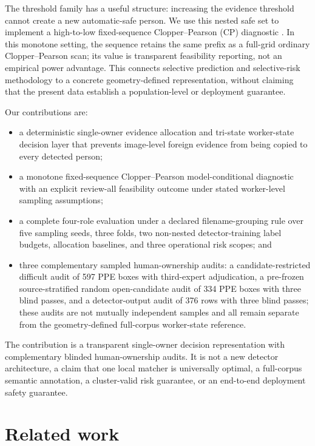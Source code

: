 \documentclass[iicol,pdflatex,sn-mathphys-num]{sn-jnl}
\begin{document}
The threshold family has a useful structure: increasing the evidence threshold cannot create a new automatic-safe person. We use this nested safe set to implement a high-to-low fixed-sequence Clopper--Pearson (CP) diagnostic \cite{clopper1934confidence}. In this monotone setting, the sequence retains the same prefix as a full-grid ordinary Clopper--Pearson scan; its value is transparent feasibility reporting, not an empirical power advantage. This connects selective prediction \cite{geifman2017selective} and selective-risk methodology \cite{angelopoulos2021learntest,angelopoulos2022conformal} to a concrete geometry-defined representation, without claiming that the present data establish a population-level or deployment guarantee.

Our contributions are:

\begin{itemize}
\item a deterministic single-owner evidence allocation and tri-state worker-state decision layer that prevents image-level foreign evidence from being copied to every detected person;
\item a monotone fixed-sequence Clopper--Pearson model-conditional diagnostic with an explicit review-all feasibility outcome under stated worker-level sampling assumptions;
\item a complete four-role evaluation under a declared filename-grouping rule over five sampling seeds, three folds, two non-nested detector-training label budgets, allocation baselines, and three operational risk scopes; and
\item three complementary sampled human-ownership audits: a candidate-restricted difficult audit of 597 PPE boxes with third-expert adjudication, a pre-frozen source-stratified random open-candidate audit of 334 PPE boxes with three blind passes, and a detector-output audit of 376 rows with three blind passes; these audits are not mutually independent samples and all remain separate from the geometry-defined full-corpus worker-state reference.
\end{itemize}

The contribution is a transparent single-owner decision representation with complementary blinded human-ownership audits. It is not a new detector architecture, a claim that one local matcher is universally optimal, a full-corpus semantic annotation, a cluster-valid risk guarantee, or an end-to-end deployment safety guarantee.

\section{Related work}\label{sec:related}
\end{document}
